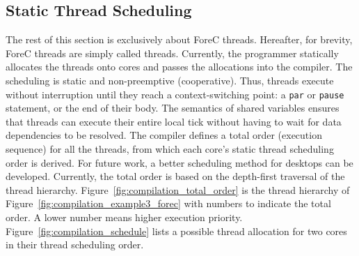 \subsection{Static Thread Scheduling}
The rest of this section is exclusively about
ForeC threads. Hereafter, for brevity, ForeC threads are simply called 
threads. Currently, the programmer statically allocates the 
threads onto cores and passes the allocations
into the compiler. The scheduling is static and
non-preemptive (cooperative). Thus, threads execute without
interruption until they reach a context-switching point: a
\verb$par$ or \verb$pause$ statement, or the end of their
body. The semantics of shared variables ensures that threads
can execute their entire local tick without having to wait
for data dependencies to be resolved. The compiler defines a
total order (execution sequence) for all the threads, from which each core's
static thread scheduling order is derived. For future work, 
a better scheduling method for desktops can be developed.
Currently, the total order
is based on the depth-first traversal of the thread
hierarchy. 
Figure~\ref{fig:compilation_total_order}
is the thread hierarchy of Figure~\ref{fig:compilation_example3_forec} 
with numbers to indicate the total
order. A lower number means higher execution
priority. Figure~\ref{fig:compilation_schedule} lists a
possible thread allocation for two cores in their thread scheduling 
order. 

